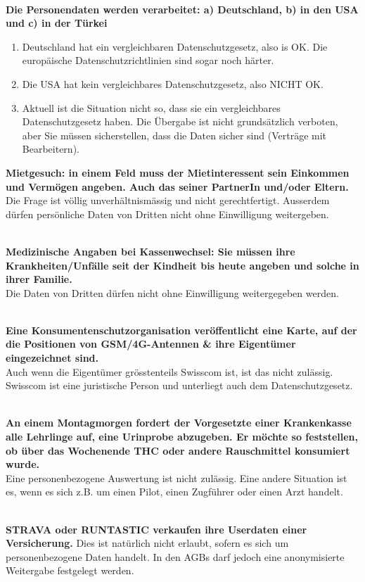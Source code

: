 \mbox{}\\
\textbf{Die Personendaten werden verarbeitet: a) Deutschland, b) in den
USA und c) in der Türkei}

\begin{enumerate}
	\tightlist
	\item Deutschland hat ein vergleichbaren Datenschutzgesetz, also is OK. Die
	europäische Datenschutzrichtlinien sind sogar noch härter.
	\item Die USA hat kein vergleichbares Datenschutzgesetz, also NICHT OK.
	\item Aktuell ist die Situation nicht so, dass sie ein vergleichbares
	Datenschutzgesetz haben. Die Übergabe ist nicht grundsätzlich
	verboten, aber Sie müssen sicherstellen, dass die Daten sicher sind
	(Verträge mit Bearbeitern).
\end{enumerate}

\textbf{Mietgesuch: in einem Feld muss der Mietinteressent sein
Einkommen und Vermögen angeben. Auch das seiner PartnerIn und/oder
Eltern.}\\
Die Frage ist völlig unverhältnismässig und nicht gerechtfertigt.
Ausserdem dürfen persönliche Daten von Dritten nicht ohne Einwilligung
weitergeben.

\mbox{}\\
\textbf{Medizinische Angaben bei Kassenwechsel: Sie müssen ihre
Krankheiten/Unfälle seit der Kindheit bis heute angeben und solche in
ihrer Familie.}\\
Die Daten von Dritten dürfen nicht ohne Einwilligung weitergegeben
werden.

\mbox{}\\
\textbf{Eine Konsumentenschutzorganisation veröffentlicht eine Karte,
auf der die Positionen von GSM/4G-Antennen \& ihre Eigentümer
eingezeichnet sind.}\\
Auch wenn die Eigentümer grösstenteils Swisscom ist, ist das nicht
zulässig. Swisscom ist eine juristische Person und unterliegt auch dem
Datenschutzgesetz.

\mbox{}\\
\textbf{An einem Montagmorgen fordert der Vorgesetzte einer Krankenkasse
alle Lehrlinge auf, eine Urinprobe abzugeben. Er möchte so feststellen,
ob über das Wochenende THC oder andere Rauschmittel konsumiert wurde.}\\
Eine personenbezogene Auswertung ist nicht zulässig. Eine andere
Situation ist es, wenn es sich z.B. um einen Pilot, einen Zugführer oder
einen Arzt handelt.

\mbox{}\\
\textbf{STRAVA oder RUNTASTIC verkaufen ihre Userdaten einer
Versicherung.} Dies ist natürlich nicht erlaubt, sofern es sich um
personenbezogene Daten handelt. In den AGBs darf jedoch eine
anonymisierte Weitergabe festgelegt werden.

